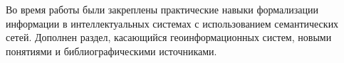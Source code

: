 Во время работы были закреплены практические навыки формализации информации в интеллектуальных системах с использованием семантических сетей. Дополнен раздел, касающийся геоинформационных систем, новыми понятиями и библиографическими источниками. 

